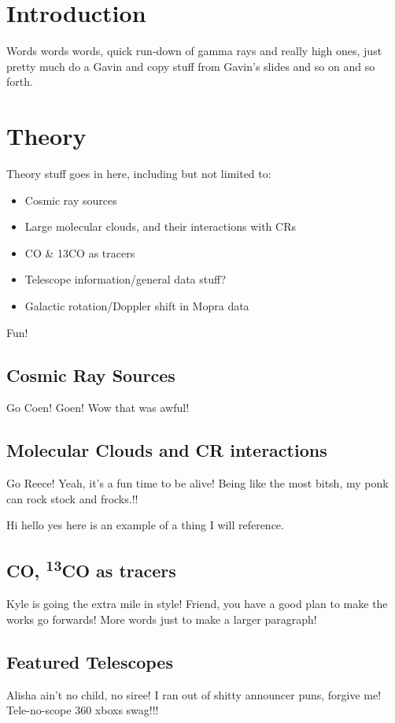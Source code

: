 \documentclass[a4paper, titlepage, oneside]{article}
\newcommand{\elem}[2]{\textsuperscript{#1}{#2}}
\begin{document}
\begin{multicols}{2}
\section{Introduction}
Words words words, quick run-down of gamma rays and really high ones, just pretty much do a Gavin and copy stuff from Gavin's slides and so on and so forth.

\section{Theory}
Theory stuff goes in here, including but not limited to:
\begin{itemize}
\item Cosmic ray sources
\item Large molecular clouds, and their interactions with CRs
\item CO \& 13CO as tracers
\item Telescope information/general data stuff?
\item Galactic rotation/Doppler shift in Mopra data
\end{itemize}
Fun!

\subsection{Cosmic Ray Sources}
Go Coen! Goen! Wow that was awful!

\subsection{Molecular Clouds and CR interactions}
Go Reece!  Yeah, it's a fun time to be alive! Being like the most bitsh, my ponk can rock stock and frocks.!!

Hi hello yes here is an example of a thing I will reference. \parencite{rmp1}

\subsection{CO, \elem{13}{CO} as tracers}
Kyle is going the extra mile in style! Friend, you have a good plan to make the works go forwards! More words just to make a larger paragraph!

\subsection{Featured Telescopes}
Alisha ain't no child, no siree! I ran out of shitty announcer puns, forgive me! Tele-no-scope 360 xboxs swag!!!


\end{multicols}
\end{document}
